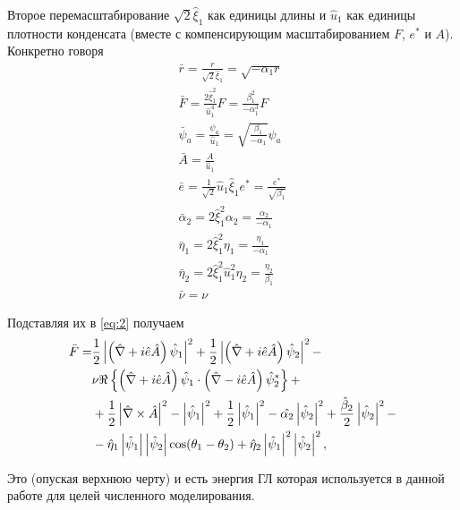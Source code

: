 Второе перемасштабирование \( \sqrt{2}\hat{\xi}_1 \) как единицы длины
и \( \hat{u}_1 \) как единицы плотности конденсата (вместе с компенсирующим
масштабированием \( F \), \( e^* \) и \( A \)). Конкретно говоря
\begin{gather}
  \bar{r} = \frac{r}{\sqrt{2}\hat{\xi}_1} = \sqrt{-\alpha_1 r} \nonumber \\
  \bar{F} = \frac{2\hat{\xi}^2_1}{\hat{u}^4_1}F =
    \frac{\beta^2_1}{-\alpha^3_1}F \nonumber \\
  \bar{\psi}_a = \frac{\psi_a}{\hat{u}_1} =
    \sqrt{\frac{\beta_1}{-\alpha_1}}\psi_a \nonumber \\
  \bar{A} = \frac{A}{\hat{u}_1} \\
  \bar{e} = \frac{1}{\sqrt{2}}\hat{u}_1\hat{\xi}_1 e^* =
    \frac{e^*}{\sqrt{\beta_1}} \nonumber \\
  \bar{\alpha}_2 = 2\hat{\xi}^2_1 \alpha_2 = \frac{\alpha_2}{-\alpha_1}
    \nonumber \\
  \bar{\eta}_1 = 2\hat{\xi}^2_1 \eta_1 = \frac{\eta_1}{-\alpha_1} \nonumber \\
  \bar{\eta}_2 = 2\hat{\xi}^2_1 \hat{u}^2_1 \eta_2 =
    \frac{\eta_2}{\beta_1} \nonumber \\
  \bar{\nu} = \nu \label{eq:B-6}
\end{gather}

Подставляя их в \eqref{eq:2} получаем
\begin{align}
  \bar{F} = & \frac{1}{2}\left| \left( \hat{\nabla} + i\hat{e}\hat{A} \right)
    \hat{\psi}_1 \right|^2 + \frac{1}{2}\left| \left( \hat{\nabla} + i\hat{e}\hat{A}
    \right)\hat{\psi}_2 \right|^2 - \nonumber \\ 
  & \nu\Re\left\{ \left( \hat{\nabla} + i\hat{e}\hat{A}
    \right) \hat{\psi}_1 \cdot \left( \hat{\nabla} - i\hat{e}\hat{A} \right)
    \hat{\psi}^*_2 \right\} + \nonumber \\
  & + \frac{1}{2}\left| \hat{\nabla}\times\hat{A} \right|^2 - \left| \hat{\psi}_1 \right|^2 +
    \frac{1}{2}\left| \hat{\psi}_1 \right|^2 - \hat{\alpha_2}\left| \hat{\psi}_2 \right|^2 +
    \frac{\hat{\beta}_2}{2}\left| \hat{\psi}_2 \right|^2 - \nonumber \\
  & - \hat{\eta}_1\left| \hat{\psi}_1 \right|\left| \hat{\psi}_2 \right| \cos(\theta_1 - \theta_2)
    + \hat{\eta}_2\left| \hat{\psi}_1 \right|^2 \left| \hat{\psi}_2 \right|^2, \label{eq:B-7}
\end{align}

Это (опуская верхнюю черту) и есть энергия ГЛ которая используется в данной 
работе для целей численного моделирования.

